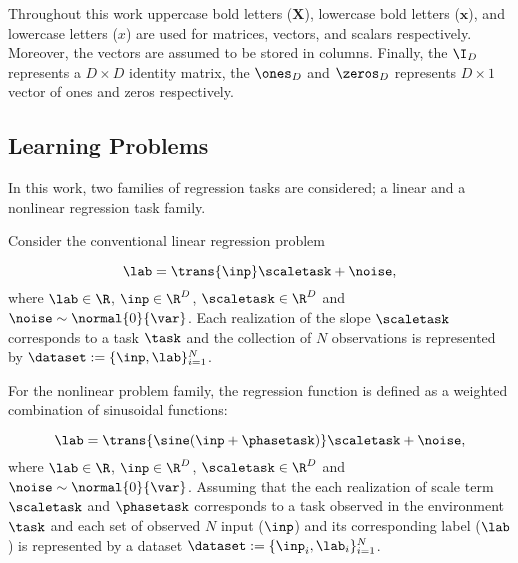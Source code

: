 Throughout this work uppercase bold letters (\eg $\mathbf{X}$), lowercase bold letters (\eg $\mathbf{x}$), and lowercase letters (\eg ${x}$) are used for matrices, vectors, and scalars respectively. Moreover, the vectors are assumed to be stored in columns. Finally, the $\I_{D}$ represents a $D\times D$ identity matrix, the $\ones_{D}$ and $\zeros_{D}$ represents $D\times 1$ vector of ones and zeros respectively.

\subsection{Learning Problems}

In this work, two families of regression tasks are considered; a linear and a nonlinear regression task family.


Consider the conventional linear regression problem

\begin{equation}\label{eq:linearreg}
  \lab = \trans{\inp}\scaletask+\noise, 
\end{equation}
where $\lab\in\R$, $\inp\in\R^D$, $\scaletask\in\R^D$ and $\noise\sim\normal{0}{\var}$. Each realization of the slope $\scaletask$ corresponds to a task $\task$ and the collection of $N$ observations is represented by $\dataset:=\{\inp, \lab\}_{i=1}^{N}$. 

For the nonlinear problem family, the regression function is defined as a weighted combination of sinusoidal functions:

\begin{equation}\label{eq:nonlinearreg}
  \lab = \trans{\sine(\inp+\phasetask)}\scaletask+\noise, 
\end{equation}
where $\lab\in\R$, $\inp\in\R^D$, $\scaletask\in\R^D$ and $\noise\sim\normal{0}{\var}$. Assuming that the each realization of scale term $\scaletask$ and $\phasetask$ corresponds to a task observed in the environment $\task$ and each set of observed $N$ input ($\inp$) and its corresponding label ($\lab$) is represented by a dataset $\dataset:=\{\inp_i, \lab_i\}_{i=1}^{N}$.

